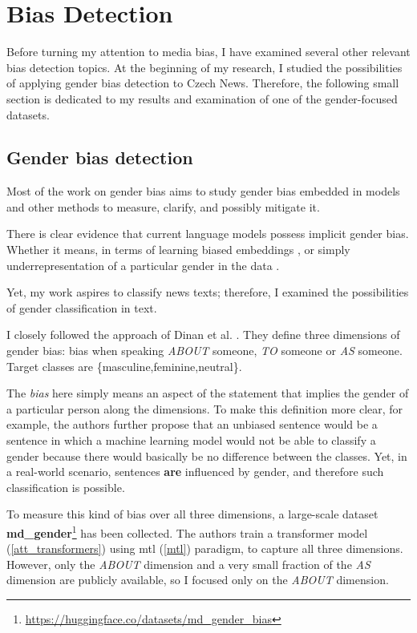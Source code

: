 \chapter{Bias Detection}
Before turning my attention to media bias, I have examined several other relevant bias detection topics. At the beginning of my research, I studied the possibilities of applying gender bias detection to Czech News. Therefore, the following small section is dedicated to my results and examination of one of the gender-focused datasets.


\section{Gender bias detection}\label{gender}
Most of the work on gender bias aims to study gender bias embedded in models and other methods to measure, clarify, and possibly mitigate it.

There is clear evidence that current language models possess implicit gender bias. Whether it means, in terms of learning biased embeddings \cite{bolukbasi2016man}, or simply underrepresentation of a particular gender in the data \cite{sun-peng-2021-men}. 

Yet, my work aspires to classify news texts; therefore, I examined the possibilities of gender classification in text.

I closely followed the approach of Dinan et al. \cite{dinan2020multi}. They define three dimensions of gender bias: bias when speaking \textit{ABOUT} someone, \textit{TO} someone or \textit{AS} someone. Target classes are \{masculine,feminine,neutral\}. 

The \textit{bias} here simply means an aspect of the statement that implies the gender of a particular person along the dimensions. To make this definition more clear, for example, the authors further propose that an unbiased sentence would be a sentence in which a machine learning model would not be able to classify a gender because there would basically be no difference between the classes. Yet, in a real-world scenario, sentences \textbf{are} influenced by gender, and therefore such classification is possible.

To measure this kind of bias over all three dimensions, a large-scale dataset \textbf{md\_gender}\footnote{\url{https://huggingface.co/datasets/md_gender_bias}} has been collected. The authors train a transformer model (\ref{att_transformers}) using \Gls{mtl} (\ref{mtl}) paradigm, to capture all three dimensions. However, only the \textit{ABOUT} dimension and a very small fraction of the \textit{AS} dimension are publicly available, so I focused only on the \textit{ABOUT} dimension.

